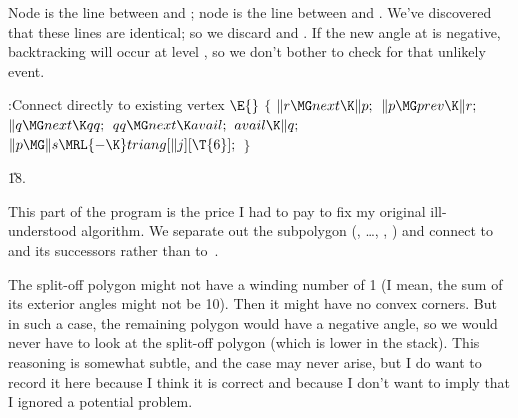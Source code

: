 Node  is the line between  and ; node  is the line between
 and . We've discovered that these lines are identical; so
we discard
 and . If the new angle at  is negative,
backtracking will
occur at level , so we don't bother to check for that unlikely
event.

\Y\B\4:Connect  directly to existing vertex %
\X${}\E{}$\6
${}\{{}$\1\6
${}\|r\MG\\{next}\K\|p;{}$\6
${}\|p\MG\\{prev}\K\|r;{}$\6
${}\|q\MG\\{next}\K\\{qq};{}$\6
${}\\{qq}\MG\\{next}\K\\{avail};{}$\6
${}\\{avail}\K\|q;{}$\6
${}\|p\MG\|s\MRL{-{\K}}\\{triang}[\|j][\T{6}];{}$\6
\4${}\}{}$\2\par
\U18.\fi

This part of the program is the price I had to pay to fix my original
ill-understood algorithm. We separate out the subpolygon (, \dots,
, ) and connect  to  and its
successors rather than to~.

The split-off polygon might not have a winding number of 1 (I mean, the
sum of its exterior angles  might not be 10). Then it might
have
no convex corners. But in such a case, the remaining polygon would have
a negative angle, so we would never have to look at the split-off polygon
(which is lower in the stack). This reasoning is somewhat subtle, and the
case may never arise, but I do want to record it here because I think it
is correct and because I don't want to imply that I ignored a
potential problem.

